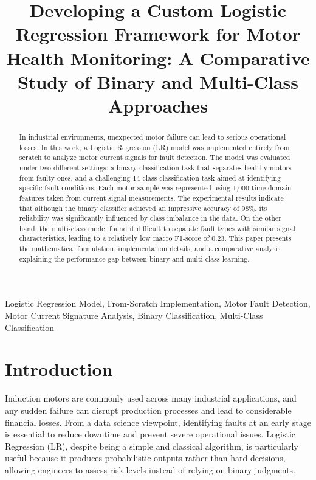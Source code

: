 \documentclass[conference]{IEEEtran}
\begin{document}
\title{Developing a Custom Logistic Regression Framework for Motor Health Monitoring: A Comparative Study of Binary and Multi-Class Approaches}

\author{
}

\maketitle

\begin{abstract}
In industrial environments, unexpected motor failure can lead to serious operational losses. In this work, a Logistic Regression (LR) model was implemented entirely from scratch to analyze motor current signals for fault detection. The model was evaluated under two different settings: a binary classification task that separates healthy motors from faulty ones, and a challenging 14-class classification task aimed at identifying specific fault conditions. Each motor sample was represented using 1,000 time-domain features taken from current signal measurements. The experimental results indicate that although the binary classifier achieved an impressive accuracy of 98\%, its reliability was significantly influenced by class imbalance in the data. On the other hand, the multi-class model found it difficult to separate fault types with similar signal characteristics, leading to a relatively low macro F1-score of 0.23. This paper presents the mathematical formulation, implementation details, and a comparative analysis explaining the performance gap between binary and multi-class learning.
\end{abstract}

\begin{IEEEkeywords}
Logistic Regression Model, From-Scratch Implementation, Motor Fault Detection, Motor Current Signature Analysis, Binary Classification, Multi-Class Classification
\end{IEEEkeywords}

\section{Introduction}
Induction motors are commonly used across many industrial applications, and any sudden failure can disrupt production processes and lead to considerable financial losses. From a data science viewpoint, identifying faults at an early stage is essential to reduce downtime and prevent severe operational issues. Logistic Regression (LR), despite being a simple and classical algorithm, is particularly useful because it produces probabilistic outputs rather than hard decisions, allowing engineers to assess risk levels instead of relying on binary judgments.
\end{document}
